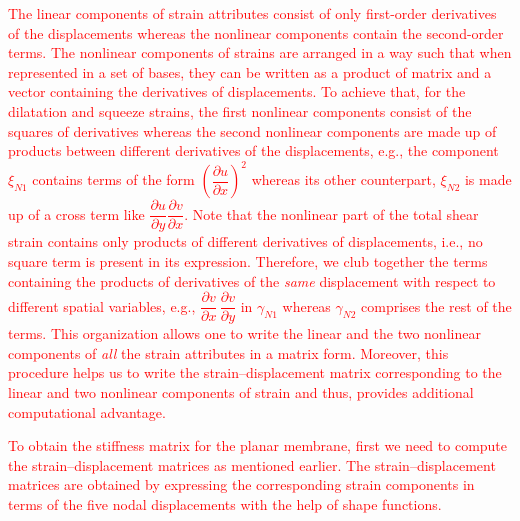 \textcolor{red}{The linear components of strain attributes consist of only first-order derivatives of the displacements whereas the nonlinear components contain the second-order terms. The nonlinear components of strains are arranged in a way such that when represented in a set of bases, they can be written as a product of matrix and a vector containing the derivatives of displacements. To achieve that, for the dilatation and squeeze strains, the first nonlinear components consist of the squares of derivatives whereas the second nonlinear components are made up of products between different derivatives of the displacements, e.g., the component $\xi_{N1}$ contains terms of the form $\left(\dfrac{\partial u}{\partial x}\right)^2$ whereas its other counterpart, $\xi_{N2}$ is made up of a cross term like $\dfrac{\partial u}{\partial y}\dfrac{\partial v}{\partial x}$. Note that the nonlinear part of the total shear strain contains only products of different derivatives of displacements, i.e., no square term is present in its expression. Therefore, we club together the terms containing the products of derivatives of the \textit{same} displacement with respect to different spatial variables, e.g., $\dfrac{\partial v}{\partial x}\,\dfrac{\partial v}{\partial y}$ in $\gamma_{N1}$ whereas $\gamma_{N2}$ comprises the rest of the terms. This organization allows one to write the linear and the two nonlinear components of \textit{all} the strain attributes in a matrix form. Moreover, this procedure helps us to write the strain--displacement matrix corresponding to the linear and two nonlinear components of strain and thus, provides additional computational advantage.}

\textcolor{red}{To obtain the stiffness matrix for the planar membrane, first we need to compute the strain--displacement matrices as mentioned earlier. The strain--displacement matrices are obtained by expressing the corresponding strain components in terms of the five nodal displacements with the help of shape functions.}

